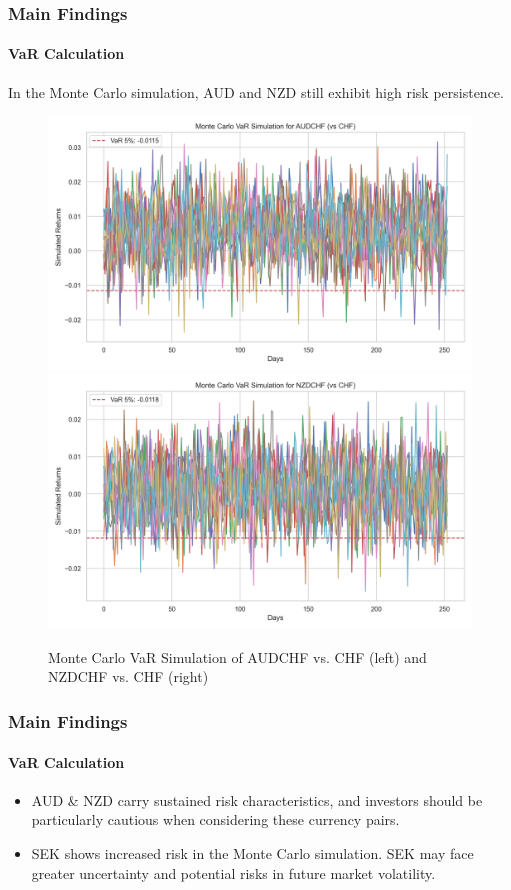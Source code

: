 \documentclass[10pt]{beamer}
\begin{document}
\begin{frame}
\frametitle{Main Findings}
\framesubtitle{VaR Calculation}
In the Monte Carlo simulation, AUD and NZD still exhibit high risk persistence.

\begin{figure}[h]
    \centering   
    \includegraphics[width=0.48\linewidth]{reports/figures/monte_carlo_var_simulation_AUDCHF_vs_CHF.png}  \label{fig:monte_carlo_var_simulation_AUDCHF_vs_CHF}
    \includegraphics[width=0.48\linewidth]{reports/figures/monte_carlo_var_simulation_NZDCHF_vs_CHF.png}   \label{fig:monte_carlo_var_simulation_NZDCHF_vs_CHF}
    \caption{\footnotesize Monte Carlo VaR Simulation of AUDCHF vs. CHF (left) and NZDCHF vs. CHF (right)}  
\end{figure}
\end{frame}
\begin{frame}
\frametitle{Main Findings}
\framesubtitle{VaR Calculation}
\begin{itemize}
    \item AUD \& NZD carry sustained risk characteristics, and investors should be particularly cautious when considering these currency pairs.
    \item SEK shows increased risk in
    the Monte Carlo simulation. SEK may face greater uncertainty and potential risks in future market volatility.
\end{itemize}
\end{frame}
\end{document}
